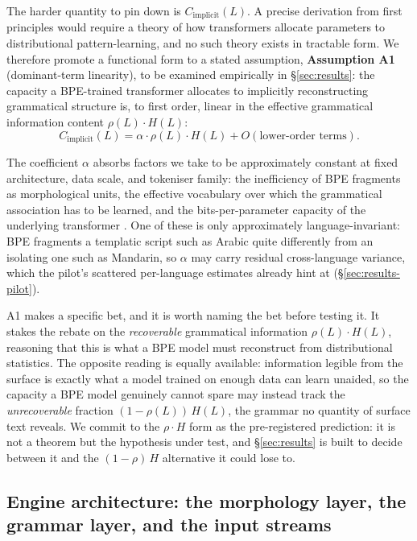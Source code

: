 The harder quantity to pin down is $C_{\mathrm{implicit}}(L)$. A precise derivation from first principles would require a theory of how transformers allocate parameters to distributional pattern-learning, and no such theory exists in tractable form. We therefore promote a functional form to a stated assumption, \textbf{Assumption A1} (dominant-term linearity), to be examined empirically in \S\ref{sec:results}: the capacity a BPE-trained transformer allocates to implicitly reconstructing grammatical structure is, to first order, linear in the effective grammatical information content $\rho(L) \cdot H(L)$:
\begin{equation}
C_{\mathrm{implicit}}(L) = \alpha \cdot \rho(L) \cdot H(L) + O(\text{lower-order terms}).
\label{eq:A1}
\end{equation}

The coefficient $\alpha$ absorbs factors we take to be approximately constant at fixed architecture, data scale, and tokeniser family: the inefficiency of BPE fragments as morphological units, the effective vocabulary over which the grammatical association has to be learned, and the bits-per-parameter capacity of the underlying transformer \citep{allenzhu2024}. One of these is only approximately language-invariant: BPE fragments a templatic script such as Arabic quite differently from an isolating one such as Mandarin, so $\alpha$ may carry residual cross-language variance, which the pilot's scattered per-language estimates already hint at (\S\ref{sec:results-pilot}).

A1 makes a specific bet, and it is worth naming the bet before testing it. It stakes the rebate on the \emph{recoverable} grammatical information $\rho(L) \cdot H(L)$, reasoning that this is what a BPE model must reconstruct from distributional statistics. The opposite reading is equally available: information legible from the surface is exactly what a model trained on enough data can learn unaided, so the capacity a BPE model genuinely cannot spare may instead track the \emph{unrecoverable} fraction $(1-\rho(L))\,H(L)$, the grammar no quantity of surface text reveals. We commit to the $\rho \cdot H$ form as the pre-registered prediction: it is not a theorem but the hypothesis under test, and \S\ref{sec:results} is built to decide between it and the $(1-\rho)\,H$ alternative it could lose to.

\subsection{Engine architecture: the morphology layer, the grammar layer, and the input streams}
\label{sec:framework-engine}

